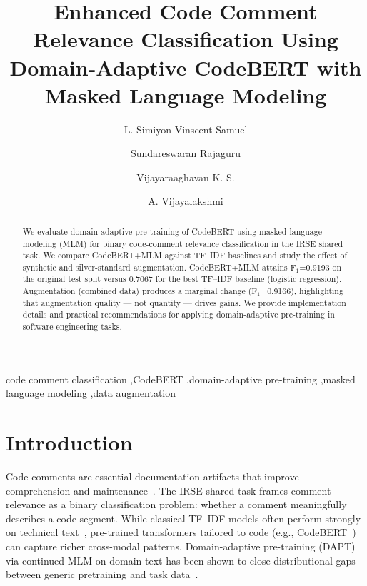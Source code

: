 \documentclass[runningheads]{ceurart}
\begin{document}

\title{Enhanced Code Comment Relevance Classification Using Domain-Adaptive CodeBERT with Masked Language Modeling}

\author[1]{L. Simiyon Vinscent Samuel}
\author[1]{Sundareswaran Rajaguru}
\author[1]{Vijayaraaghavan K. S.}
\author[1]{A. Vijayalakshmi}

\address[1]{Department of Computer Science and Engineering,
Sri Sivasubramaniya Nadar College of Engineering,
Chennai,India}



\begin{abstract}
We evaluate domain-adaptive pre-training of CodeBERT using masked language modeling (MLM) for binary code-comment relevance classification in the IRSE shared task. We compare CodeBERT+MLM against TF--IDF baselines and study the effect of synthetic and silver-standard augmentation. CodeBERT+MLM attains F$_1$=0.9193 on the original test split versus 0.7067 for the best TF--IDF baseline (logistic regression). Augmentation (combined data) produces a marginal change (F$_1$=0.9166), highlighting that augmentation quality — not quantity — drives gains. We provide implementation details and practical recommendations for applying domain-adaptive pre-training in software engineering tasks.
\end{abstract}

\begin{keywords}
code comment classification \sep CodeBERT \sep domain-adaptive pre-training \sep masked language modeling \sep data augmentation
\end{keywords}

\maketitle

\section{Introduction}
Code comments are essential documentation artifacts that improve comprehension and maintenance~\cite{rani2023decade,majumdar2022automated}. The IRSE shared task frames comment relevance as a binary classification problem: whether a comment meaningfully describes a code segment. While classical TF--IDF models often perform strongly on technical text~\cite{basu2023identification}, pre-trained transformers tailored to code (e.g., CodeBERT~\cite{feng2020codebert}) can capture richer cross-modal patterns. Domain-adaptive pre-training (DAPT) via continued MLM on domain text has been shown to close distributional gaps between generic pretraining and task data~\cite{gururangan2020dapt}. 
\end{document}
